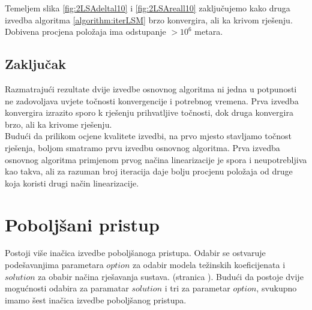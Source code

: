 \documentclass[a4paper,twoside,12pt]{memoir} %
\begin{document}
Temeljem slika \ref{fig:2LSAdeltal10} i \ref{fig:2LSAreall10} zaključujemo kako druga izvedba
algoritma \ref{algorithm:iterLSM} brzo konvergira, ali ka krivom rješenju.\\
Dobivena procjena položaja ima odstupanje $> 10^6$ metara.

\subsection{Zaključak} 
Razmatrajući rezultate dvije izvedbe osnovnog algoritma ni jedna u potpunosti ne zadovoljava uvjete
točnosti konvergencije i potrebnog vremena. Prva izvedba konvergira izrazito sporo k
rješenju prihvatljive točnosti, dok druga konvergira brzo, ali ka krivome rješenju.\\
Budući da prilikom ocjene kvalitete izvedbi, na prvo mjesto stavljamo točnost rješenja,
boljom smatramo prvu izvedbu osnovnog algoritma.
Prva izvedba osnovnog algoritma primjenom prvog načina linearizacije je spora i neupotrebljiva kao takva, ali za razuman broj iteracija daje bolju procjenu položaja od druge koja koristi drugi način linearizacije. \\


\section{Poboljšani pristup}
Postoji više inačica izvedbe poboljšanoga pristupa. Odabir se ostvaruje podešavanjima parametara $option$  za odabir modela težinskih koeficijenata i $solution$ za obabir načina rješavanja sustava. (stranica \pageref{eq:elevationTezine1}). Budući da postoje dvije mogućnosti 
odabira za paramatar $solution$ i tri za parametar $option$, svukupno imamo šest inačica izvedbe poboljšanog pristupa.
\end{document}
